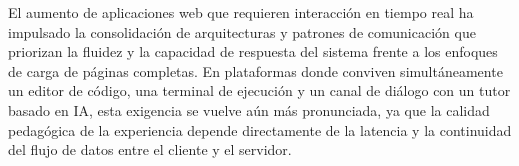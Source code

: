 El aumento de aplicaciones web que requieren interacción en tiempo real ha impulsado la consolidación de arquitecturas y patrones de comunicación que priorizan la fluidez y la capacidad de respuesta del sistema frente a los enfoques de carga de páginas completas. En plataformas donde conviven simultáneamente un editor de código, una terminal de ejecución y un canal de diálogo con un tutor basado en IA, esta exigencia se vuelve aún más pronunciada, ya que la calidad pedagógica de la experiencia depende directamente de la latencia y la continuidad del flujo de datos entre el cliente y el servidor.
